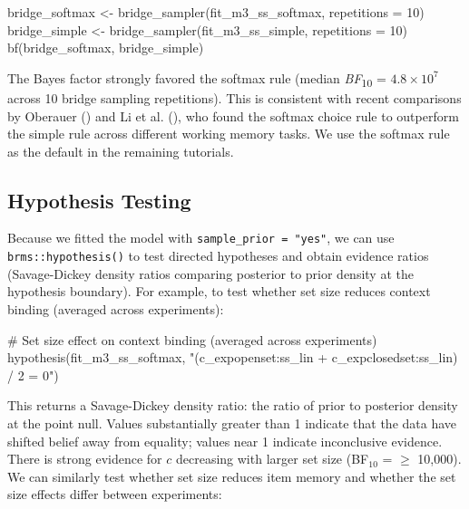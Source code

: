 \documentclass[
  man,
  floatsintext,
  longtable,
  nolmodern,
  notxfonts,
  notimes,
  colorlinks=true,linkcolor=blue,citecolor=blue,urlcolor=blue]{apa7}
\newenvironment{Shaded}{\begin{snugshade}}{\end{snugshade}}
\newcommand{\AttributeTok}[1]{\textcolor[rgb]{0.40,0.45,0.13}{#1}}
\newcommand{\CommentTok}[1]{\textcolor[rgb]{0.37,0.37,0.37}{#1}}
\newcommand{\DecValTok}[1]{\textcolor[rgb]{0.68,0.00,0.00}{#1}}
\newcommand{\FunctionTok}[1]{\textcolor[rgb]{0.28,0.35,0.67}{#1}}
\newcommand{\NormalTok}[1]{\textcolor[rgb]{0.00,0.23,0.31}{#1}}
\newcommand{\OtherTok}[1]{\textcolor[rgb]{0.00,0.23,0.31}{#1}}
\newcommand{\StringTok}[1]{\textcolor[rgb]{0.13,0.47,0.30}{#1}}
\begin{document}
\begin{Shaded}
\begin{Highlighting}[]
\NormalTok{bridge\_softmax }\OtherTok{\textless{}{-}} \FunctionTok{bridge\_sampler}\NormalTok{(fit\_m3\_ss\_softmax, }\AttributeTok{repetitions =} \DecValTok{10}\NormalTok{)}
\NormalTok{bridge\_simple  }\OtherTok{\textless{}{-}} \FunctionTok{bridge\_sampler}\NormalTok{(fit\_m3\_ss\_simple,  }\AttributeTok{repetitions =} \DecValTok{10}\NormalTok{)}
\FunctionTok{bf}\NormalTok{(bridge\_softmax, bridge\_simple)}
\end{Highlighting}
\end{Shaded}

The Bayes factor strongly favored the softmax rule (median
\emph{BF}\textsubscript{10} = \(4.8 \times 10^{7}\) across 10 bridge
sampling repetitions). This is consistent with recent comparisons by
Oberauer () and Li et al.
(), who found the softmax choice
rule to outperform the simple rule across different working memory
tasks. We use the softmax rule as the default in the remaining
tutorials.

\subsection{Hypothesis Testing}\label{hypothesis-testing}

Because we fitted the model with \texttt{sample\_prior\ =\ "yes"}, we
can use \texttt{brms::hypothesis()} to test directed hypotheses and
obtain evidence ratios (Savage-Dickey density ratios comparing posterior
to prior density at the hypothesis boundary). For example, to test
whether set size reduces context binding (averaged across experiments):

\begin{Shaded}
\begin{Highlighting}[]
\CommentTok{\# Set size effect on context binding (averaged across experiments)}
\FunctionTok{hypothesis}\NormalTok{(fit\_m3\_ss\_softmax,}
  \StringTok{"(c\_expopenset:ss\_lin + c\_expclosedset:ss\_lin) / 2 = 0"}\NormalTok{)}
\end{Highlighting}
\end{Shaded}

This returns a Savage-Dickey density ratio: the ratio of prior to
posterior density at the point null. Values substantially greater than 1
indicate that the data have shifted belief away from equality; values
near 1 indicate inconclusive evidence. There is strong evidence for
\(c\) decreasing with larger set size (BF\(_{10}\) = \(\geq\) 10,000).
We can similarly test whether set size reduces item memory and whether
the set size effects differ between experiments:
\end{document}
